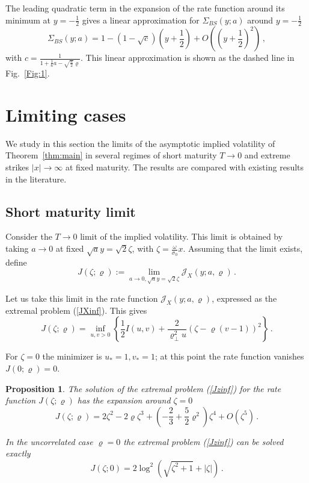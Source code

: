 \documentclass[11pt]{article}
\numberwithin{equation}{section}
\theoremstyle{plain}
\newtheorem{proposition}[theorem]{Proposition}
\begin{document}
The leading quadratic term in the expansion of the rate function around
its minimum at $y=-\frac12$ gives a linear
approximation for $\Sigma_{BS}(y;a)$ around $y=-\frac12$
\begin{equation}\label{SigBSlin}
\Sigma_{BS}(y;a) = 1 - (1-\sqrt{c}) \left(y+\frac12\right)
+ O\left(\left(y+\frac12\right)^2\right)\,, 
\end{equation}
with $c = \frac{1}{1 + \frac16 a - \sqrt{\frac{a}{2}}\varrho}$.
This linear approximation is shown as the dashed line in Fig.~\ref{Fig:1}.

\section{Limiting cases}
\label{sec:6}

We study in this section the limits of the asymptotic implied volatility
of Theorem~\ref{thm:main} in several regimes of short maturity $T\to 0$
and extreme strikes $|x|\to \infty$ at fixed maturity. 
The results are compared with existing results in the literature. 


\subsection{Short maturity limit}
\label{sec:6.1}

Consider the $T\to 0$ limit of the implied volatility. 
This limit is obtained by taking $a\to 0$ at fixed $\sqrt{a} y = \sqrt2 \zeta$,
with $\zeta= \frac{\omega}{\sigma_0} x$. Assuming that the limit exists,
define
\begin{equation}\label{Jdef}
J(\zeta;\varrho) := \lim_{a\to 0, \sqrt{a} y =\sqrt2 \zeta} 
\mathcal{J}_X(y;a,\varrho)\,.
\end{equation}


Let us take this limit in the rate function $\mathcal{J}_X(y;a,\varrho)$, 
expressed as the extremal problem (\ref{JXinf}). This gives
\begin{equation}\label{Jzinf}
J(\zeta;\varrho) = 
\inf_{u,v>0} \left\{ \frac12 I(u,v) + 
\frac{2}{\varrho_\perp^2 u} \left( \zeta  
- \varrho (v-1) \right)^2 \right\} \,.
\end{equation}

For $\zeta=0$ the minimizer is $u_*=1,v_*=1$; at this point 
the rate function vanishes $J(0;\varrho) = 0$.


\begin{proposition}
The solution of the extremal problem (\ref{Jzinf}) for the rate
function $J(\zeta;\varrho)$ has the expansion around $\zeta=0$
\begin{equation}\label{Jzexp}
J(\zeta;\varrho) =
2\zeta^2 - 2 \varrho \zeta^3 + \left(-\frac23 + \frac52 \varrho^2\right) 
\zeta^4 + O(\zeta^5) \,.
\end{equation}

In the uncorrelated case $\varrho=0$ the extremal
problem (\ref{Jzinf}) can be solved exactly 
\begin{equation}\label{Jzero}
J(\zeta;0) = 
2\log^2 \left( \sqrt{\zeta^2+1} + |\zeta|\right)\,.
\end{equation}
\end{proposition}
\end{document}
